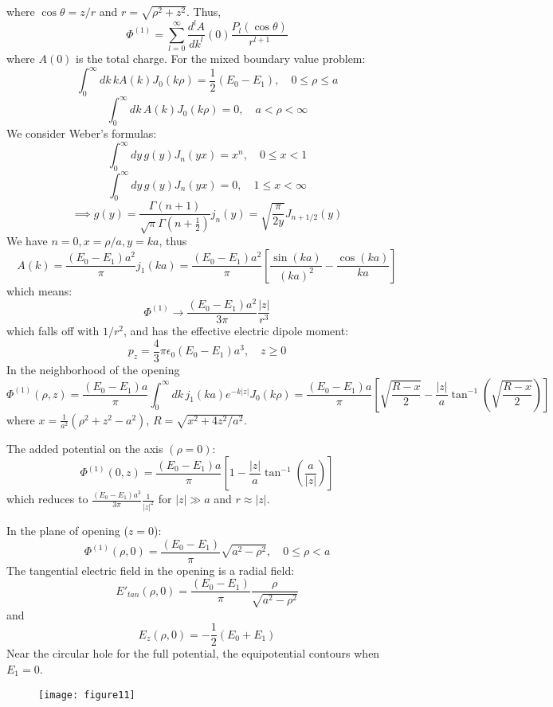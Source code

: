 \documentclass{article}
\begin{document}
	where $\cos\theta = z/r$ and $r=\sqrt{\rho^2+z^2}$.
	Thus,
	\[
	\Phi^{(1)} = \sum_{l=0}^\infty \frac{d^l A}{dk^l}(0) \frac{P_l(\cos\theta)}{r^{l+1}}
	\]
	where $A(0)$ is the total charge.
	For the mixed boundary value problem:
	\[
	\int_0^\infty dk \, k A(k) J_0(k\rho) = \frac{1}{2}(E_0 - E_1), \quad 0 \le \rho \le a
	\]
	\[
	\int_0^\infty dk \, A(k) J_0(k\rho) = 0, \quad a < \rho < \infty
	\]
	We consider Weber's formulas:
	\[
	\int_0^\infty dy \, g(y) J_n(yx) = x^n, \quad 0 \le x < 1
	\]
	\[
	\int_0^\infty dy \, g(y) J_n(yx) = 0, \quad 1 \le x < \infty
	\]
	\[
	\implies g(y) = \frac{\Gamma(n+1)}{\sqrt{\pi}\Gamma(n+\frac{1}{2})} j_n(y) = \sqrt{\frac{\pi}{2y}} J_{n+1/2}(y)
	\]
	We have $n=0, x=\rho/a, y=ka$, thus
	\[
	A(k) = \frac{(E_0-E_1)a^2}{\pi} j_1(ka) = \frac{(E_0-E_1)a^2}{\pi} \left[ \frac{\sin(ka)}{(ka)^2} - \frac{\cos(ka)}{ka} \right]
	\]
	which means:
	\[
	\Phi^{(1)} \to \frac{(E_0-E_1)a^2}{3\pi} \frac{|z|}{r^3}
	\]
	which falls off with $1/r^2$, and has the effective electric dipole moment:
	\[
	p_z = \frac{4}{3}\pi \epsilon_0 (E_0-E_1)a^3, \quad z \ge 0
	\]
	In the neighborhood of the opening
	\[
	\Phi^{(1)}(\rho,z) = \frac{(E_0-E_1)a}{\pi} \int_0^\infty dk \, j_1(ka) e^{-k|z|} J_0(k\rho) = \frac{(E_0-E_1)a}{\pi} \left[ \sqrt{\frac{R-x}{2}} - \frac{|z|}{a} \tan^{-1}\left(\sqrt{\frac{R-x}{2}}\right) \right]
	\]
	where $x=\frac{1}{a^2}(\rho^2+z^2-a^2)$, $R=\sqrt{x^2+4z^2/a^2}$.
	
	The added potential on the axis $(\rho=0)$:
	\[
	\Phi^{(1)}(0,z) = \frac{(E_0-E_1)a}{\pi} \left[ 1 - \frac{|z|}{a}\tan^{-1}\left(\frac{a}{|z|}\right) \right]
	\]
	which reduces to $\frac{(E_0-E_1)a^3}{3\pi} \frac{1}{|z|^2}$ for $|z|\gg a$ and $r \approx |z|$.
	
	In the plane of opening ($z=0$):
	\[
	\Phi^{(1)}(\rho,0) = \frac{(E_0-E_1)}{\pi} \sqrt{a^2-\rho^2}, \quad 0 \le \rho < a
	\]
	The tangential electric field in the opening is a radial field:
	\[
	E'_{tan}(\rho,0) = \frac{(E_0-E_1)}{\pi} \frac{\rho}{\sqrt{a^2-\rho^2}}
	\]
	and
	\[
	E_z(\rho,0) = -\frac{1}{2}(E_0+E_1)
	\]
	Near the circular hole for the full potential, the equipotential contours when $E_1=0$. 
	
	\begin{figure}[h]
		\centering
		\texttt{[image: figure11]}
		\caption{}
		\label{fig:figure11}
	\end{figure}
	
	
	
	
\end{document}
